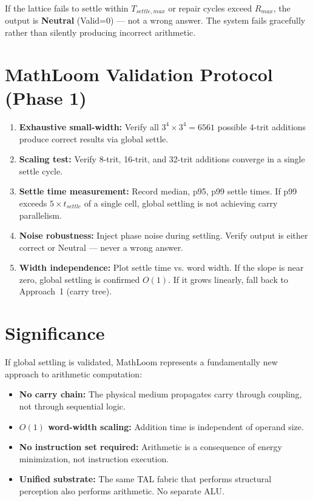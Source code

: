 \documentclass[11pt, a4paper]{report}
\begin{document}
If the lattice fails to settle within $T_{settle,max}$ or repair cycles
exceed $R_{max}$, the output is \textbf{Neutral} (Valid=0) --- not a
wrong answer. The system fails gracefully rather than silently producing
incorrect arithmetic.

\section{MathLoom Validation Protocol (Phase 1)}

\begin{enumerate}[nosep]
  \item \textbf{Exhaustive small-width:} Verify all $3^4 \times 3^4 = 6561$
        possible 4-trit additions produce correct results via global settle.
  \item \textbf{Scaling test:} Verify 8-trit, 16-trit, and 32-trit
        additions converge in a single settle cycle.
  \item \textbf{Settle time measurement:} Record median, p95, p99 settle
        times. If p99 exceeds $5 \times t_{settle}$ of a single cell,
        global settling is not achieving carry parallelism.
  \item \textbf{Noise robustness:} Inject phase noise during settling.
        Verify output is either correct or Neutral --- never a wrong answer.
  \item \textbf{Width independence:} Plot settle time vs. word width.
        If the slope is near zero, global settling is confirmed $O(1)$.
        If it grows linearly, fall back to Approach~1 (carry tree).
\end{enumerate}

\section{Significance}

If global settling is validated, MathLoom represents a fundamentally new
approach to arithmetic computation:
\begin{itemize}[nosep]
  \item \textbf{No carry chain:} The physical medium propagates carry
        through coupling, not through sequential logic.
  \item \textbf{$O(1)$ word-width scaling:} Addition time is independent
        of operand size.
  \item \textbf{No instruction set required:} Arithmetic is a consequence
        of energy minimization, not instruction execution.
  \item \textbf{Unified substrate:} The same TAL fabric that performs
        structural perception also performs arithmetic. No separate ALU.
\end{itemize}
\end{document}

